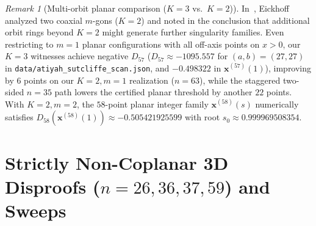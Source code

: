 \documentclass[11pt,reqno]{amsart}
\theoremstyle{remark}
\newtheorem{remark}[theorem]{Remark}
\begin{document}
\begin{remark}[Multi-orbit planar comparison ($K=3$ vs.\ $K=2$)]
In~\cite{Eickhoff2026}, Eickhoff analyzed two coaxial $m$-gons ($K = 2$) and noted in the conclusion that additional orbit rings beyond $K = 2$ might generate further singularity families.
Even restricting to $m = 1$ planar configurations with all off-axis points on $x > 0$, our $K = 3$ witnesses achieve negative $D_{57}$ ($D_{57} \approx -1095.557$ for $(a,b) = (27,27)$ in \texttt{data/atiyah\_sutcliffe\_scan.json}, and $-0.498322$ in $\mathbf{x}^{(57)}(1)$), improving by $6$ points on our $K = 2, m = 1$ realization ($n = 63$), while the staggered two-sided $n = 35$ path lowers the certified planar threshold by another $22$ points.
With $K = 2, m = 2$, the $58$-point planar integer family $\mathbf{x}^{(58)}(s)$ numerically satisfies $D_{58}(\mathbf{x}^{(58)}(1)) \approx -0.505421925599$ with root $s_0 \approx 0.999969508354$.
\end{remark}

\section{Strictly Non-Coplanar 3D Disproofs ($n = 26, 36, 37, 59$) and Sweeps}\label{sec:3d}
\end{document}
